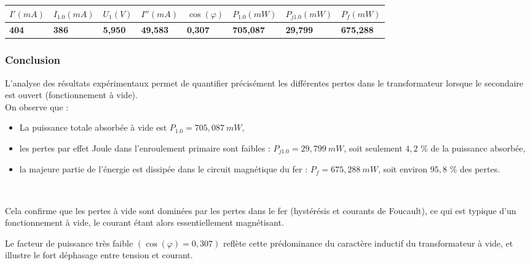 \documentclass[french, 12pt]{article}
\begin{document}
\begin{table}[H]
	\centering
	\begin{tabular}{ | M{1.7cm} | M{1.7cm} | M{1.5cm} | M{1.7cm} | M{1.2cm} | M{1.8cm} | M{2cm} | M{1.7cm} | }
		\hline
		$I' \left( \si{mA} \right)$ & $I_{1.0} \left( \si{mA} \right)$ & $U_1 \left( \si{V} \right)$ & $I'' \left( \si{mA} \right)$ & $\cos(\varphi)$ & $P_{1.0} \left( \si{mW} \right)$ & $P_{j1.0} \left( \si{mW} \right)$ & $P_f \left( \si{mW} \right)$ \\
		\hline
		\color{purple} \textbf{404} & \color{purple} \textbf{386} & \color{purple} \textbf{5,950} & \color{purple} \textbf{49,583} & \color{purple} \textbf{0,307} & \color{purple} \textbf{705,087} & \color{purple} \textbf{29,799} & \color{purple} \textbf{675,288} \\
		\hline
	\end{tabular}
\end{table}

\subsubsection{Conclusion}

L’analyse des résultats expérimentaux permet de quantifier précisément les différentes pertes dans le transformateur lorsque le secondaire est ouvert (fonctionnement à vide). \\

On observe que :

\begin{itemize}
	\item La puissance totale absorbée à vide est $P_{1.0} = 705,087\ \si{mW}$,
	\item les pertes par effet Joule dans l’enroulement primaire sont faibles : $P_{j1.0} = 29,799\ \si{mW}$, soit seulement $4,2$ \% de la puissance absorbée,
	\item la majeure partie de l’énergie est dissipée dans le circuit magnétique du fer : $P_f = 675,288\ \si{mW}$, soit environ $95,8$ \% des pertes.
\end{itemize}

\

Cela confirme que les pertes à vide sont dominées par les pertes dans le fer (hystérésis et courants de Foucault), ce qui est typique d’un fonctionnement à vide, le courant étant alors essentiellement magnétisant.

Le facteur de puissance très faible $\left( \cos(\varphi) = 0,307 \right)$ reflète cette prédominance du caractère inductif du transformateur à vide, et illustre le fort déphasage entre tension et courant.
\end{document}
